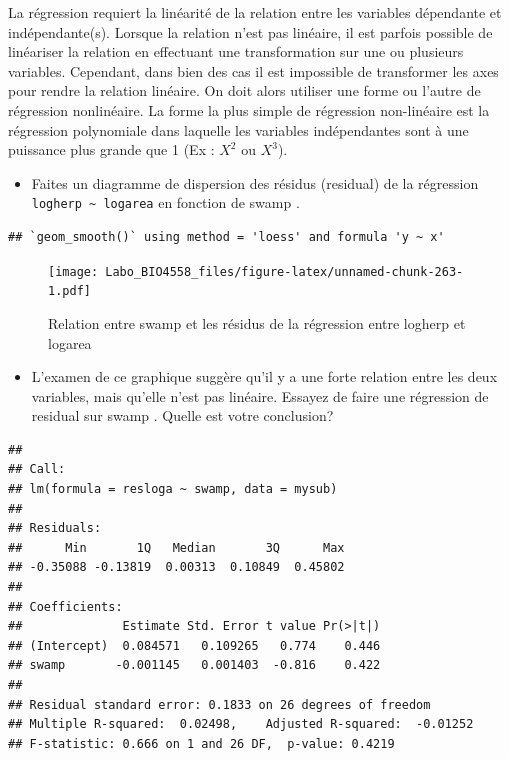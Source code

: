 \documentclass[
  12pt,
]{book}
\providecommand{\tightlist}{%
  \setlength{\itemsep}{0pt}\setlength{\parskip}{0pt}}
\begin{document}
La régression requiert la linéarité de la relation entre les variables dépendante et indépendante(s). Lorsque la relation n'est pas linéaire, il est parfois possible de linéariser la relation en effectuant une transformation sur une ou plusieurs variables. Cependant, dans bien des cas il est impossible de transformer les axes pour rendre la relation linéaire. On doit alors utiliser une forme ou l'autre de régression nonlinéaire. La forme la plus simple de régression non-linéaire est la régression polynomiale dans laquelle les variables indépendantes sont à une puissance plus grande que 1 (Ex : \(X^2\) ou \(X^3\)).

\begin{itemize}
\tightlist
\item
  Faites un diagramme de dispersion des résidus (residual) de la régression \texttt{logherp\ \textasciitilde{}\ logarea} en fonction de swamp .
\end{itemize}

\begin{verbatim}
## `geom_smooth()` using method = 'loess' and formula 'y ~ x'
\end{verbatim}

\begin{figure}
\centering
\texttt{[image: Labo\_BIO4558\_files/figure-latex/unnamed-chunk-263-1.pdf]}
\caption{\label{fig:unnamed-chunk-263}Relation entre swamp et les résidus de la régression entre logherp et logarea}
\end{figure}

\begin{itemize}
\tightlist
\item
  L'examen de ce graphique suggère qu'il y a une forte relation entre les deux variables, mais qu'elle n'est pas linéaire. Essayez de faire une régression de residual sur swamp . Quelle est votre conclusion?
\end{itemize}

\begin{verbatim}
## 
## Call:
## lm(formula = resloga ~ swamp, data = mysub)
## 
## Residuals:
##      Min       1Q   Median       3Q      Max 
## -0.35088 -0.13819  0.00313  0.10849  0.45802 
## 
## Coefficients:
##              Estimate Std. Error t value Pr(>|t|)
## (Intercept)  0.084571   0.109265   0.774    0.446
## swamp       -0.001145   0.001403  -0.816    0.422
## 
## Residual standard error: 0.1833 on 26 degrees of freedom
## Multiple R-squared:  0.02498,    Adjusted R-squared:  -0.01252 
## F-statistic: 0.666 on 1 and 26 DF,  p-value: 0.4219
\end{verbatim}
\end{document}

